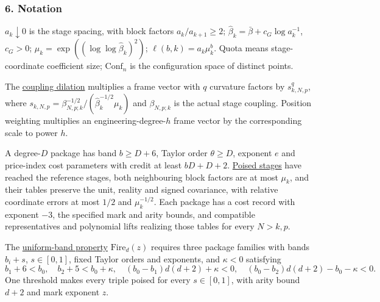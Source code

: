 \documentclass[
  letterpaper,
  11pt]{article}
\begin{document}
\subsubsection{6. Notation}\label{notation-30}

\(a_k\downarrow0\) is the stage spacing, with block factors
\(a_k/a_{k+1}\ge2\); \(\hat\beta_k=\bar\beta+c_G\log a_k^{-1}\),
\(c_G>0\); \(\mu_k=\exp((\log\log\hat\beta_k)^2)\);
\(\ell(b,k)=a_k\mu_k^b\). Quota means stage-coordinate coefficient size;
\(\mathrm{Conf}_n\) is the configuration space of distinct points.

The
\href{https://github.com/yang-mills-group/OpenAI-YM-20261028/blob/3456e5e75cf8d4cd558955a5c7638fba2d68f464/YM/Next/RANK/Matrices.lean\#L104}{coupling
dilation} multiplies a frame vector with \(q\) curvature factors by
\(s_{k,N,p}^q\), where
\(s_{k,N,p}=\beta_{N,p;k}^{-1/2}/(\hat\beta_k^{-1/2}\mu_k)\) and
\(\beta_{N,p;k}\) is the actual stage coupling. Position weighting
multiplies an engineering-degree-\(h\) frame vector by the corresponding
scale to power \(h\).

A degree-\(D\) package has band \(b\ge D+6\), Taylor order
\(\theta\ge D\), exponent \(e\) and price-index cost parameters with
credit at least \(bD+D+2\).
\href{https://github.com/yang-mills-group/OpenAI-YM-20261028/blob/3456e5e75cf8d4cd558955a5c7638fba2d68f464/YM/TraceExtension/Prom/Orion/Plume.lean\#L23-L28}{Poised
stages} have reached the reference stages, both neighbouring block
factors are at most \(\mu_k\), and their tables preserve the unit,
reality and signed covariance, with relative coordinate errors at most
\(1/2\) and \(\mu_k^{-1/2}\). Each package has a cost record with
exponent \(-3\), the specified mark and arity bounds, and compatible
representatives and polynomial lifts realizing those tables for every
\(N>k,p\).

The
\href{https://github.com/yang-mills-group/OpenAI-YM-20261028/blob/3456e5e75cf8d4cd558955a5c7638fba2d68f464/YM/TraceExtension/Prom/Order/State.lean\#L29-L32}{uniform-band
property} \(\mathrm{Fire}_d(z)\) requires three package families with
bands \(b_i+s\), \(s\in[0,1]\), fixed Taylor orders and exponents, and
\(\kappa<0\) satisfying
\[b_1+6<b_0,\quad b_2+5<b_0+\kappa,\quad (b_0-b_1)d(d+2)+\kappa<0,\quad (b_0-b_2)d(d+2)-b_0-\kappa<0.\]
One threshold makes every triple poised for every \(s\in[0,1]\), with
arity bound \(d+2\) and mark exponent \(z\).
\end{document}
